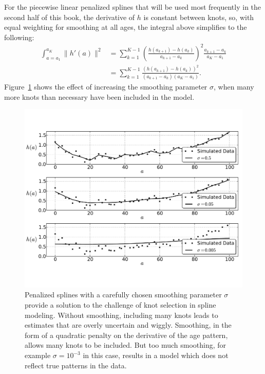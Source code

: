 For the piecewise linear penalized splines that will be used most
frequently in the second half of this book, the derivative of $h$ is
constant between knots, so, with equal weighting for smoothing at all
ages, the integral above simplifies to the following:
\begin{align*}
\int _{a=a_1} ^{a_K} \| h'(a) \|^2
& = \sum_{k=1} ^{K-1} \left(\frac{h(a_{k+1}) - h(a_k)}{a_{k+1}-a_k}\right)^2 \frac{a_{k+1}-a_k}{a_K - a_1}\\
&= \sum_{k=1} ^{K-1} \frac{\left(h(a_{k+1}) - h(a_k)\right)^2}{(a_{k+1}-a_k)(a_K - a_1)}.
\end{align*}
Figure~\ref{smoothing-splines} shows the effect of increasing the
smoothing parameter $\sigma$, when many more knots than necessary have been included in the model.

\begin{figure}[h]
\begin{center}
\includegraphics[width=\textwidth]{smoothing-splines.pdf}
\caption{Penalized splines with a carefully chosen smoothing parameter
  $\sigma$ provide a solution to the challenge of knot selection in
  spline modeling.  Without smoothing, including many knots leads to
  estimates that are overly uncertain and wiggly.  Smoothing, in the
  form of a quadratic penalty on the derivative of the age pattern,
  allows many knots to be included.  But too much smoothing, for
  example $\sigma=10^{-3}$ in this case, results in a model which does
  not reflect true patterns in the data.}
\label{smoothing-splines}
\end{center}
\end{figure}


